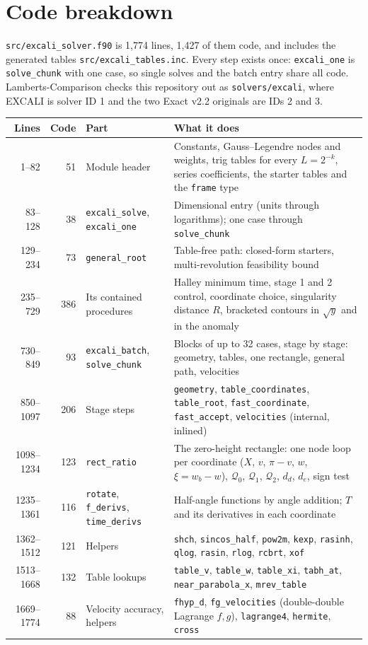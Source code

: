 \documentclass[11pt]{article}
\newcommand{\code}[1]{\texttt{#1}}
\newcommand{\Q}{\mathcal{Q}}
\begin{document}
\section{Code breakdown}

\code{src/excali\_solver.f90} is 1,774 lines, 1,427 of them code, and includes the generated tables \code{src/excali\_tables.inc}. Every step exists once: \code{excali\_one} is \code{solve\_chunk} with one case, so single solves and the batch entry share all code. Lamberts-Comparison checks this repository out as \code{solvers/excali}, where EXCALI is solver ID 1 and the two Exact v2.2 originals are IDs 2 and 3.

{\small
\begin{tabularx}{\linewidth}{r r >{\raggedright\arraybackslash}p{3.7cm} >{\raggedright\arraybackslash}X}
\toprule
Lines & Code & Part & What it does \\
\midrule
1--82 & 51 & Module header & Constants, Gauss--Legendre nodes and weights, trig tables for every $L=2^{-k}$, series coefficients, the starter tables and the \code{frame} type \\
83--128 & 38 & \code{excali\_solve}, \code{excali\_one} & Dimensional entry (units through logarithms); one case through \code{solve\_chunk} \\
129--234 & 73 & \code{general\_root} & Table-free path: closed-form starters, multi-revolution feasibility bound \\
235--729 & 386 & Its contained procedures & Halley minimum time, stage 1 and 2 control, coordinate choice, singularity distance $R$, bracketed contours in $\sqrt{y}$ and in the anomaly \\
730--849 & 93 & \code{excali\_batch}, \code{solve\_chunk} & Blocks of up to 32 cases, stage by stage: geometry, tables, one rectangle, general path, velocities \\
850--1097 & 206 & Stage steps & \code{geometry}, \code{table\_coordinates}, \code{table\_root}, \code{fast\_coordinate}, \code{fast\_accept}, \code{velocities} (internal, inlined) \\
1098--1234 & 123 & \code{rect\_ratio} & The zero-height rectangle: one node loop per coordinate ($X$, $v$, $\pi-v$, $w$, $\xi=w_b-w$), $\Q_0$, $\Q_1$, $\Q_2$, $d_d$, $d_e$, sign test \\
1235--1361 & 116 & \code{rotate}, \code{f\_derivs}, \code{time\_derivs} & Half-angle functions by angle addition; $T$ and its derivatives in each coordinate \\
1362--1512 & 121 & Helpers & \code{shch}, \code{sincos\_half}, \code{pow2m}, \code{kexp}, \code{rasinh}, \code{qlog}, \code{rasin}, \code{rlog}, \code{rcbrt}, \code{xof} \\
1513--1668 & 132 & Table lookups & \code{table\_v}, \code{table\_w}, \code{table\_xi}, \code{tabh\_at}, \code{near\_parabola\_x}, \code{mrev\_table} \\
1669--1774 & 88 & Velocity accuracy, helpers & \code{fhyp\_d}, \code{fg\_velocities} (double-double Lagrange $f,g$), \code{lagrange4}, \code{hermite}, \code{cross} \\
\bottomrule
\end{tabularx}
}
\end{document}
